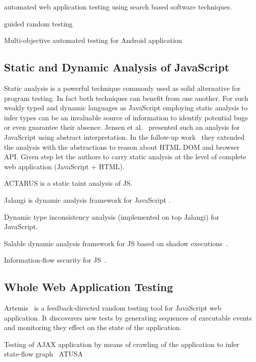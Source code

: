 \documentclass[sigconf]{acmart}
\begin{document}
\cite{alshahwan2011automated} automated web application testing using search based software techniques.

\cite{ma2015grt} guided random testing

\cite{mao2016sapienz} Multi-objective automated testing for Android application

\subsection{Static and Dynamic Analysis of JavaScript}
\label{sub.sec.js.static.anal}

Static analysis is a powerful technique commonly used as solid alternative for program testing. In fact both techniques can benefit from one another. For such weakly typed and dynamic languages as JavaScript employing static analysis to infer types can be an invaluable source of information to identify potential bugs or even guarantee their absence. Jensen et al.~\cite{tajs2009} presented such an analysis for JavaScript using abstract interpretation. In the follow-up work~\cite{dom2011} they extended the analysis with the abstractions to reason about HTML DOM and browser API. Given step let the authors to carry static analysis at the level of complete web application (JavaScript + HTML).
\cite{jquery2014}


ACTARUS is a static taint analysis of JS\cite{guarnieri2011saving}.

Jalangi is dynamic analysis framework for JavaScript \cite{sen2013jalangi}.

Dynamic type inconsistency analysis (implemented on top Jalangi) for JavaScript\cite{pradel2015typedevil}.

Salable dynamic analysis framework for JS based on shadow executions~\cite{create_citation}.

Information-flow security for JS~\cite{hedin2012information}.

\subsection{Whole Web Application Testing}
\label{sub.sec.web.app.test}

Artemis~\cite{artemis2011} is a feedback-directed random testing tool for JavaScript web application. It discoverers new tests by generating sequences of executable events and monitoring they effect on the state of the application. \cite{ail2013}

Testing of AJAX application by means of crawling of the application to infer state-flow graph~\cite{mesbah2012crawling} ATUSA ~\cite{mesbah2012invariant}
\end{document}
